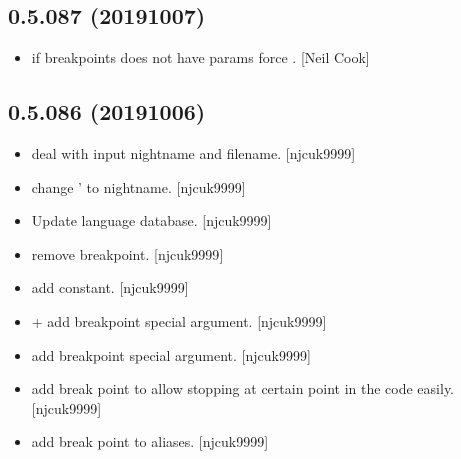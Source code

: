 \documentclass[a4paper,10pt,english]{report}
\begin{document}
\subsection{0.5.087 (2019\sphinxhyphen{}10\sphinxhyphen{}07)}
\label{\detokenize{misc/changelog:id74}}\begin{itemize}
\item {} 
 \sphinxhyphen{} if breakpoints does not have
params force . {[}Neil Cook{]}

\end{itemize}


\subsection{0.5.086 (2019\sphinxhyphen{}10\sphinxhyphen{}06)}
\label{\detokenize{misc/changelog:id75}}\begin{itemize}
\item {} 
 \sphinxhyphen{} deal with input nightname and
filename. {[}njcuk9999{]}

\item {} 
 \sphinxhyphen{} change ’ to nightname. {[}njcuk9999{]}

\item {} 
Update language database. {[}njcuk9999{]}

\item {} 
 \sphinxhyphen{} remove breakpoint. {[}njcuk9999{]}

\item {} 
 \sphinxhyphen{} add 
constant. {[}njcuk9999{]}

\item {} 
 +  \sphinxhyphen{} add breakpoint special
argument. {[}njcuk9999{]}

\item {} 
 \sphinxhyphen{} add breakpoint special argument.
{[}njcuk9999{]}

\item {} 
 \sphinxhyphen{} add break point to allow
stopping at certain point in the code easily. {[}njcuk9999{]}

\item {} 
 \sphinxhyphen{} add break point to aliases. {[}njcuk9999{]}

\end{itemize}
\end{document}
